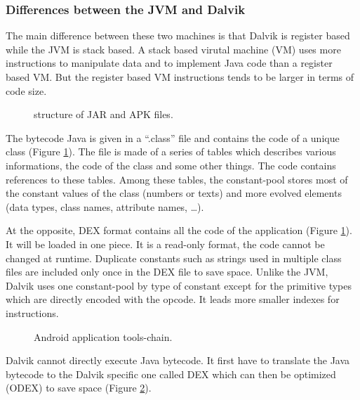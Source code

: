 \documentclass{sig-alternate}
\def \DALVIK{Dalvik\xspace}
\def \ANDROID{Android\xspace}
\def \JVM{JVM\xspace}
\def \DEX{DEX\xspace}
\begin{document}
    \subsubsection{Differences between the JVM and \DALVIK}

      The main difference between these two machines is that \DALVIK is register based while the \JVM is stack based.
      A stack based virutal machine (VM) uses more instructions to manipulate data and to implement Java code than a register based VM.
      But the register based VM instructions tends to be larger in terms of code size\cite{ieee-paul-kundu-energy-perspective}.

      \begin{figure}[!h]
        \centering \resizebox{\linewidth}{!}{}
        \caption{structure of JAR and APK files.}
        \label{SJA}
      \end{figure}

      The bytecode Java is given in a ``.class'' file and contains the code of a unique class (Figure \ref{SJA}).
      The file is made of a series of tables which describes various informations, the code of the class and some other things.
      The code contains references to these tables.
      Among these tables, the constant-pool stores most of the constant values of the class (numbers or texts)
      and more evolved elements (data types, class names, attribute names, \dots).

      At the opposite, \DEX format contains all the code of the application (Figure \ref{SJA}).
      It will be loaded in one piece.
      It is a read-only format, the code cannot be changed at runtime.
      Duplicate constants such as strings used in multiple class files
      are included only once in the \DEX file to save space.
      Unlike the \JVM, \DALVIK uses one constant-pool by type of constant
      except for the primitive types which are directly encoded with the opcode.
      It leads more smaller indexes for instructions.\\

      \begin{figure}[!h]
        \centering \resizebox{\linewidth}{!}{}
        \caption{\ANDROID application tools-chain.}
        \label{DTC}
      \end{figure}

      \DALVIK cannot directly execute Java bytecode.
      It first have to translate the Java bytecode to the \DALVIK specific one called \DEX
      which can then be optimized (\mbox{ODEX}) to save space (Figure \ref{DTC}).
\end{document}
